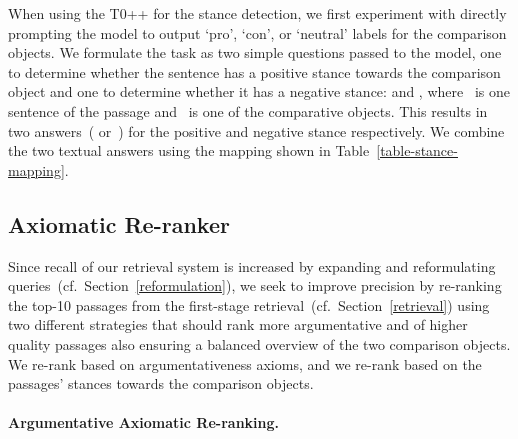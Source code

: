 When using the T0++ for the stance detection, we first experiment with directly prompting the model to output `pro', `con',  or `neutral' labels for the comparison objects.
We formulate the task as two simple questions passed to the model, one to determine whether the sentence has a positive stance towards the comparison object and one to determine whether it has a negative stance:  and , where ~is one sentence of the passage and ~is one of the comparative objects.
This results in two answers~( or~) for the positive and negative stance respectively. We combine the two textual answers using the mapping shown in Table~\ref{table-stance-mapping}.

\subsection{Axiomatic Re-ranker}
\label{reranking}


Since recall of our retrieval system is increased by expanding and reformulating queries~(cf.\ Section~\ref{reformulation}), we seek to improve precision by re-ranking the top-10 passages from the first-stage retrieval~(cf.\ Section~\ref{retrieval}) using two different strategies that should rank more argumentative and of higher quality passages also ensuring a balanced overview of the two comparison objects. \Ni We re-rank based on argumentativeness axioms, and \Nii we re-rank based on the passages' stances towards the comparison objects.

\paragraph{Argumentative Axiomatic Re-ranking.}

